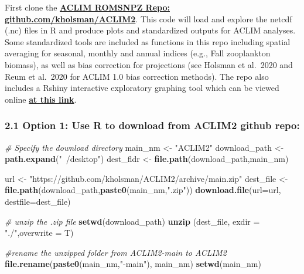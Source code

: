 \documentclass[
]{article}
\newenvironment{Shaded}{\begin{snugshade}}{\end{snugshade}}
\newcommand{\CommentTok}[1]{\textcolor[rgb]{0.56,0.35,0.01}{\textit{#1}}}
\newcommand{\DataTypeTok}[1]{\textcolor[rgb]{0.13,0.29,0.53}{#1}}
\newcommand{\KeywordTok}[1]{\textcolor[rgb]{0.13,0.29,0.53}{\textbf{#1}}}
\newcommand{\NormalTok}[1]{#1}
\newcommand{\StringTok}[1]{\textcolor[rgb]{0.31,0.60,0.02}{#1}}
\begin{document}
First clone the \href{https://github.com/kholsman/ACLIM2}{\textbf{ACLIM
ROMSNPZ Repo: github.com/kholsman/ACLIM2}}. This code will load and
explore the netcdf (.nc) files in R and produce plots and standardized
outputs for ACLIM analyses. Some standardized tools are included as
functions in this repo including spatial averaging for seasonal, monthly
and annual indices (e.g., Fall zooplankton biomass), as well as bias
correction for projections (see Holsman et al.~2020 and Reum et al.~2020
for ACLIM 1.0 bias correction methods). The repo also includes a Rshiny
interactive exploratory graphing tool which can be viewed online
\href{https://kholsman.shinyapps.io/aclim/}{\textbf{at this link}}.

\hypertarget{option-1-use-r-to-download-from-aclim2-github-repo}{%
\subsubsection{2.1 Option 1: Use R to download from ACLIM2 github
repo:}\label{option-1-use-r-to-download-from-aclim2-github-repo}}

\begin{Shaded}
\begin{Highlighting}[]
    \CommentTok{# Specify the download directory}
\NormalTok{    main_nm       <-}\StringTok{ "ACLIM2"}
\NormalTok{    download_path <-}\StringTok{ }\KeywordTok{path.expand}\NormalTok{(}\StringTok{"~/desktop"}\NormalTok{)}
\NormalTok{    dest_fldr     <-}\StringTok{ }\KeywordTok{file.path}\NormalTok{(download_path,main_nm)}
    
\NormalTok{    url           <-}\StringTok{ "https://github.com/kholsman/ACLIM2/archive/main.zip"}
\NormalTok{    dest_file     <-}\StringTok{ }\KeywordTok{file.path}\NormalTok{(download_path,}\KeywordTok{paste0}\NormalTok{(main_nm,}\StringTok{".zip"}\NormalTok{))}
    \KeywordTok{download.file}\NormalTok{(}\DataTypeTok{url=}\NormalTok{url, }\DataTypeTok{destfile=}\NormalTok{dest_file)}
    
    \CommentTok{# unzip the .zip file}
    \KeywordTok{setwd}\NormalTok{(download_path)}
    \KeywordTok{unzip}\NormalTok{ (dest_file, }\DataTypeTok{exdir =} \StringTok{"./"}\NormalTok{,}\DataTypeTok{overwrite =}\NormalTok{ T)}
    
    \CommentTok{#rename the unzipped folder from ACLIM2-main to ACLIM2}
    \KeywordTok{file.rename}\NormalTok{(}\KeywordTok{paste0}\NormalTok{(main_nm,}\StringTok{"-main"}\NormalTok{), main_nm)}
    \KeywordTok{setwd}\NormalTok{(main_nm)}
\end{Highlighting}
\end{Shaded}
\end{document}

